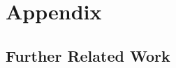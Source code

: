 \documentclass{article}
\theoremstyle{plain}
\theoremstyle{remark}
\begin{document}



\section{Appendix}

\subsection{Further Related Work}
\label{app:related-work}
\end{document}
